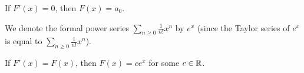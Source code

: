 \begin{remark}
  If $F'(x) = 0$, then $F(x) = a_0$.
\end{remark}

We denote the formal power series $\sum_{n \ge 0} \frac{1}{n!} x^n$ by $e^x$
(since the Taylor series of $e^x$ is equal to
$\sum_{n \ge 0} \frac{1}{n!} x^n$).
\begin{remark}
  If $F'(x) = F(x)$, then $F(x) = c e^x$ for some $c \in \mathbb{R}$.
\end{remark}
